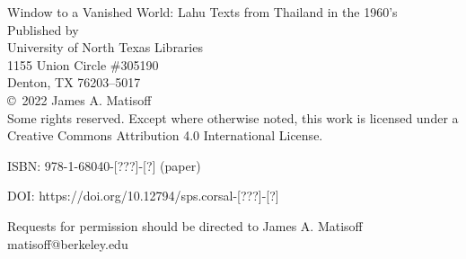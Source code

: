 \thispagestyle{empty}
\begin{center}
\vspace*{\fill}
Window to a Vanished World: Lahu Texts from Thailand in the 1960’s \\
\vspace{10em}
Published by \\
University of North Texas Libraries \\
1155 Union Circle \#305190 \\
Denton, TX  76203–5017 \\
\vspace{10em}
\copyright \ 2022 James A. Matisoff \\
Some rights reserved. Except where otherwise noted, this work is licensed under a Creative Commons Attribution 4.0 International License.

ISBN: 978-1-68040-[???]-[?] (paper)

DOI: https://doi.org/10.12794/sps.corsal-[???]-[?]


Requests for permission should be directed to James A. Matisoff matisoff@berkeley.edu

\vspace{10em}
\date{Compiled on \today\ at \currenttime}
\end{center}